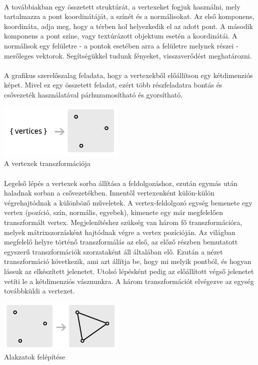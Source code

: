 \documentclass[12pt]{report}
\begin{document}
\paragraph{}
A továbbiakban egy összetett struktúrát, a vertexeket fogjuk használni, mely tartalmazza a pont koordinátáját, a színét és a normálisokat. Az első komponens, koordináta, adja meg, hogy a térben hol helyezkedik el az adott pont. A második komponens a pont színe, vagy textúrázott objektum esetén a koordinátái. A normálisok egy felületre - a pontok esetében arra a felületre melynek részei - merőleges vektorok. Segítségükkel tudunk fényeket, visszaverődést meghatározni.
\paragraph{}
A grafikus szerelőszalag feladata, hogy a vertexekből előállítson egy kétdimenziós képet. Mivel ez egy összetett feladat, ezért több részfeladatra bontás és csővezeték használatával párhuzamosítható és gyorsítható.
\begin{center}
\includegraphics[width=6cm]{pics/vertex_transformation}\\
{\footnotesize A vertexek transzformációja}
\end{center}
\paragraph{}
Legelső lépés a vertexek sorba állítása a feldolgozáshoz, ezután egymás után haladnak sorban a csővezetékben. Innentől vertexenként külön-külön végrehajtódnak a különböző műveletek. A vertex-feldolgozó egység bemenete egy vertex (pozíció, szín, normális, egyebek), kimenete egy már megfelelően transzformált vertex. Megjelenítéshez szükség van három fő transzformációra, melyek mátrixszorzásként hajtódnak végre a vertex pozícióján. Az világban megfelelő helyre történő transzformálás az első, az előző részben bemutatott egyszerű transzformációk szorzataként áll általában elő. Ezután a nézet transzformáció következik, ami azt állítja be, hogy mi melyik pontból, és hogyan lássuk az elkészített jelenetet. Utolsó lépésként pedig az előállított végső jelenetet vetíti le a kétdimenziós vásznunkra. A három transzformációt elvégezve az egység továbbküldi a vertexet.
\begin{center}
\includegraphics[width=6cm]{pics/shape_assembly}\\
{\footnotesize Alakzatok felépítése}
\end{center}
\end{document}
